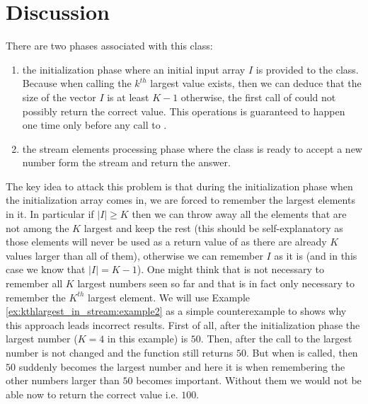 \section{Discussion}
\label{kth_largest_in_stream:sec:discussion}
There are two phases associated with this class:
\begin{enumerate}
	\item the initialization phase where an initial input array $I$ is provided to the class.
		Because when calling  the $k^{th}$ largest value exists, then we can deduce that
		the size of the vector $I$ is at least $K-1$ otherwise, the first call of  could
		not possibly return the correct value. This operations is guaranteed to happen one time only
		before any call to .
	\item the stream elements processing phase where the class is ready to accept a new number form
	the stream and return the answer.
\end{enumerate}
The key idea to attack this problem is that during the initialization phase when the initialization
array comes in, we are forced to remember the largest elements in it. In particular if $|I| \geq K$
then we can throw away all the elements that are not among the $K$ largest and keep the rest (this
should be self-explanatory as those elements will never be used as a return value of  as
there are already $K$ values larger than all of them), otherwise we can remember $I$ as it is (and
in this case we know that $|I| = K-1$). One might think that is not necessary to remember all $K$
largest numbers seen so far and that is in fact only necessary to remember the $K^{th}$ largest
element. We will use Example \ref{ex:kthlargest_in_stream:example2} as a simple counterexample to
shows why this approach leads incorrect results. First of all, after the initialization phase the
 largest number ($K=4$ in this example) is $50$. Then, after the call to  the
 largest number is not changed and the function still returns $50$. But when
 is called, then $50$ suddenly becomes the  largest number and here it is
when remembering the other numbers larger than $50$ becomes important. Without them we would not be
able now to return the correct value i.e. $100$.

